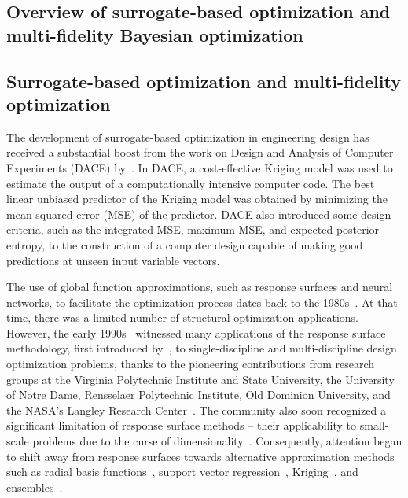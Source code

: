 \documentclass[iicol,sn-basic]{sn-jnl}%
\theoremstyle{thmstyleone}%
\theoremstyle{thmstyletwo}
\theoremstyle{thmstylethree}
\begin{document}
\begin{linenumbers}
\section{Overview of surrogate-based optimization and multi-fidelity Bayesian optimization}\label{Sec2}

\subsection{Surrogate-based optimization and multi-fidelity optimization}\label{Sec21}

The development of surrogate-based optimization in engineering design has received a substantial boost from the work on Design and Analysis of Computer Experiments (DACE) by~\cite{Sacks1989}.
In DACE, a cost-effective Kriging model was used to estimate the output of a computationally intensive computer code.
The best linear unbiased predictor of the Kriging model was obtained by minimizing the mean squared error (MSE) of the predictor.
DACE also introduced some design criteria, such as the integrated MSE, maximum MSE, and expected posterior entropy, to the construction of a computer design capable of making good predictions at unseen input variable vectors.

The use of global function approximations, such as response surfaces and neural networks, to facilitate the optimization process dates back to the 1980s~\citep{Barthelemy1993}.
At that time, there was a limited number of structural optimization applications.
However, the early 1990s~\citep{Sobieski1997} witnessed many applications of the response surface methodology, first introduced by~\cite{Box1951}, to single-discipline and multi-discipline design optimization problems, thanks to the pioneering contributions from research groups at the Virginia Polytechnic Institute and State University, the University of Notre Dame, Rensselaer Polytechnic Institute, Old Dominion University, and the NASA's Langley Research Center~\citep{Viana2014}.
The community also soon recognized a significant limitation of response surface methods -- their applicability to small-scale problems due to the curse of dimensionality~\citep{Barthelemy1993}.
Consequently, attention began to shift away from response surfaces towards alternative approximation methods such as radial basis functions~\citep{Hussain2002}, support vector regression~\citep{Girosi1998}, Kriging~\citep{Cressie1990,Kleijnen2009}, and ensembles~\citep{Goel2007}. 


\end{linenumbers}
\end{document}
